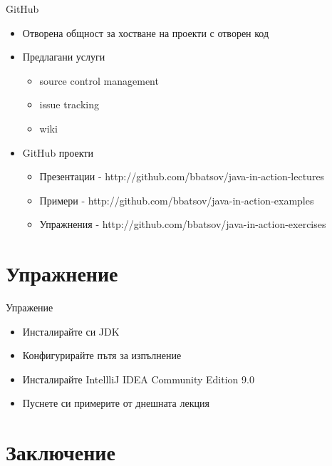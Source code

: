 \documentclass{beamer}
\begin{document}
\begin{frame}{GitHub}
  \transdissolve
  \begin{itemize}
    \item Отворена общност за хостване на
    проекти с отворен код
    \item Предлагани услуги
      \begin{itemize}
        \item source control management
        \item issue tracking
        \item wiki
      \end{itemize}
    \item GitHub проекти
      \begin{itemize}
      \item Презентации -
        http://github.com/bbatsov/java-in-action-lectures 
        \item Примери -
          http://github.com/bbatsov/java-in-action-examples
        \item Упражнения -
          http://github.com/bbatsov/java-in-action-exercises
      \end{itemize}

  \end{itemize}
\end{frame}

\section{Упражнение}
\begin{frame}{Упражение}
  \transdissolve  
  \begin{itemize}
    \item Инсталирайте си JDK
    \item Конфигурирайте пътя за изпълнение
    \item Инсталирайте IntellliJ IDEA Community Edition 9.0
    \item Пуснете си примерите от днешната
    лекция
  \end{itemize}
\end{frame}

\section*{Заключение}
\end{document}
